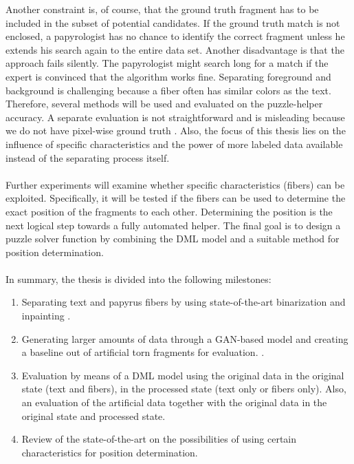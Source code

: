 \documentclass[12pt,a4paper]{article}
\begin{document}
Another constraint is, of course, that the ground truth fragment has to be included in the subset of potential candidates. If the ground truth match is not enclosed, a papyrologist has no chance to identify the correct fragment unless he extends his search again to the entire data set. Another disadvantage is that the approach fails silently. The papyrologist might search long for a match if the expert is convinced that the algorithm works fine. Separating foreground and background is challenging because a fiber often has similar colors as the text. Therefore, several methods will be used and evaluated on the puzzle-helper accuracy. A separate evaluation is not straightforward and is misleading because we do not have pixel-wise ground truth \cite{Tensmeyer20}. Also, the focus of this thesis lies on the influence of specific characteristics and the power of more labeled data available instead of the separating process itself.
\\\\
Further experiments will examine whether specific characteristics (fibers) can be exploited. Specifically, it will be tested if the fibers can be used to determine the exact position of the fragments to each other. Determining the position is the next logical step towards a fully automated helper. The final goal is to design a puzzle solver function by combining the DML model and a suitable method for position determination. 
\\\\
In summary, the thesis is divided into the following milestones:

\begin{enumerate}[label=\bf{\Roman*.}]
	\item Separating text and papyrus fibers by using state-of-the-art binarization \cite{Tensmeyer20} and inpainting \cite{Liu18Impainting}.
	
	\item Generating larger amounts of data through a GAN-based model and creating a baseline out of artificial torn fragments for evaluation.  \cite{Goodfellow14, Tamrin21}.
	
	\item  Evaluation by means of a DML model using the original data in the original state (text and fibers), in the processed state (text only or fibers only). Also, an evaluation of the artificial data together with the original data in the original state and processed state.
	
	\item Review of the state-of-the-art on the possibilities of using certain characteristics for position determination.      	      	      
\end{enumerate}
\end{document}
